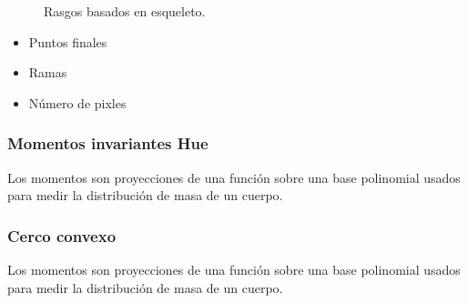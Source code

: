 \documentclass[a4paper, 11pt]{article}
\begin{document}
\begin{figure}[ht]%
    \centering
    \qquad
    \caption{Rasgos basados en esqueleto.}%
    \label{entropia}%
\end{figure}

\begin{itemize}
\item Puntos finales
\item Ramas
\item Número de pixles
\end{itemize}

\subsubsection{Momentos invariantes Hue}

Los momentos son proyecciones de una función sobre una base polinomial usados para medir la distribución de masa de un cuerpo.

\subsubsection{Cerco convexo}

Los momentos son proyecciones de una función sobre una base polinomial usados para medir la distribución de masa de un cuerpo.
\end{document}
